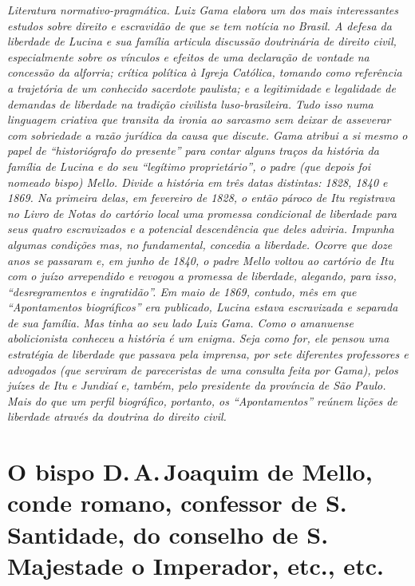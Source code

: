 \begin{didascalia}\itshape
Literatura normativo-pragmática. Luiz Gama elabora um dos mais
interessantes estudos sobre direito e escravidão de que se tem notícia
no Brasil. A defesa da liberdade de Lucina e sua família articula
discussão doutrinária de direito civil, especialmente sobre os vínculos
e efeitos de uma declaração de vontade na concessão da alforria; crítica
política à Igreja Católica, tomando como referência a trajetória de um
conhecido sacerdote paulista; e a legitimidade e legalidade de demandas
de liberdade na tradição civilista luso-brasileira. Tudo isso numa
linguagem criativa que transita da ironia ao sarcasmo sem deixar de
asseverar com sobriedade a razão jurídica da causa que discute. Gama
atribui a si mesmo o papel de ``historiógrafo do presente'' para contar
alguns traços da história da família de Lucina e do seu ``legítimo
proprietário'', o padre (que depois foi nomeado bispo) Mello. Divide a
história em três datas distintas: 1828, 1840 e 1869. Na primeira delas,
em fevereiro de 1828, o então pároco de Itu registrava no Livro de Notas
do cartório local uma promessa condicional de liberdade para seus quatro
escravizados e a potencial descendência que deles adviria. Impunha
algumas condições mas, no fundamental, concedia a liberdade. Ocorre que
doze anos se passaram e, em junho de 1840, o padre Mello voltou ao
cartório de Itu com o juízo arrependido e revogou a promessa de
liberdade, alegando, para isso, ``desregramentos e ingratidão''. Em maio
de 1869, contudo, mês em que ``Apontamentos biográficos'' era
publicado, Lucina estava escravizada e separada de sua família. Mas
tinha ao seu lado Luiz Gama. Como o amanuense abolicionista conheceu a
história é um enigma. Seja como for, ele pensou uma estratégia de
liberdade que passava pela imprensa, por sete diferentes professores e
advogados (que serviram de pareceristas de uma consulta feita por Gama),
pelos juízes de Itu e Jundiaí e, também, pelo presidente da província de
São Paulo. Mais do que um perfil biográfico, portanto, os
``Apontamentos'' reúnem lições de liberdade através da doutrina do
direito civil.
\end{didascalia}



\section{O bispo D.\,A.\,Joaquim de Mello,\protect\footnotemark{} conde romano, confessor de S.\,Santidade, do conselho de S.\,Majestade o Imperador, etc., etc.}

